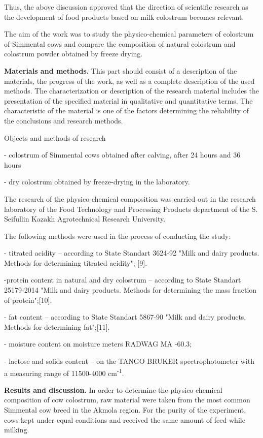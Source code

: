 \begin{multicols}{2}
Thus, the above discussion approved that the direction of scientific
research as the development of food products based on milk colostrum
becomes relevant.

The aim of the work was to study the physico-chemical parameters of
colostrum of Simmental cows and compare the composition of natural
colostrum and colostrum powder obtained by freeze drying.

{\bfseries Materials and methods.} This part should consist of a
description of the materials, the progress of the work, as well as a
complete description of the used methods. The characterization or
description of the research material includes the presentation of the
specified material in qualitative and quantitative terms. The
characteristic of the material is one of the factors determining the
reliability of the conclusions and research methods.

Objects and methods of research

- colostrum of Simmental cows obtained after calving, after 24 hours and
36 hours

- dry colostrum obtained by freeze-drying in the laboratory.

The research of the physico-chemical composition was carried out in the
research laboratory of the Food Technology and Processing Products
department of the S. Seifullin Kazakh Agrotechnical Research University.

The following methods were used in the process of conducting the study:

- titrated acidity -- according to State Standart 3624-92 "Milk and
dairy products. Methods for determining titrated acidity"; {[}9{]}.

-protein content in natural and dry colostrum -- according to State
Standart 25179-2014 "Milk and dairy products. Methods for determining
the mass fraction of protein";{[}10{]}.

- fat content -- according to State Standart 5867-90 "Milk and dairy
products. Methods for determining fat";{[}11{]}.

- moisture content on moisture meters RADWAG MA -60.3;

- lactose and solids content -- on the TANGO BRUKER spectrophotometer
with a measuring range of 11500-4000 cm\textsuperscript{-1}.

{\bfseries Results and discussion.} In order to determine the
physico-chemical composition of cow colostrum, raw material were taken
from the most common Simmental cow breed in the Akmola region. For the
purity of the experiment, cows kept under equal conditions and received
the same amount of feed while milking.


\end{multicols}
